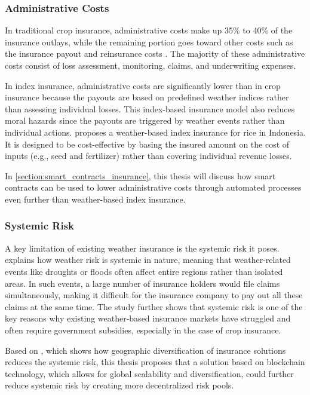 \subsubsection{Administrative Costs}
 
In traditional crop insurance, administrative costs make up 35\% to 40\% of the insurance outlays, while the remaining portion goes toward other costs such as the insurance payout and reinsurance costs \autocite{glauber2004crop}. The majority of these administrative costs consist of loss assessment, monitoring, claims, and underwriting expenses.
 
In index insurance, administrative costs are significantly lower than in crop insurance because the payouts are based on predefined weather indices rather than assessing individual losses. This index-based insurance model also reduces moral hazards since the payouts are triggered by weather events rather than individual actions. \textcite{kusuma2018viable} proposes a weather-based index insurance for rice in Indonesia. It is designed to be cost-effective by basing the insured amount on the cost of inputs (e.g., seed and fertilizer) rather than covering individual revenue losses.
 
In \cref{section:smart_contracts_insurance}, this thesis will discuss how smart contracts can be used to lower administrative costs through automated processes even further than weather-based index insurance.
 
\subsubsection{Systemic Risk}
 
A key limitation of existing weather insurance is the systemic risk it poses. \textcite{xu2010systemic} explains how weather risk is systemic in nature, meaning that weather-related events like droughts or floods often affect entire regions rather than isolated areas. In such events, a large number of insurance holders would file claims simultaneously, making it difficult for the insurance company to pay out all these claims at the same time. The study further shows that systemic risk is one of the key reasons why existing weather-based insurance markets have struggled and often require government subsidies, especially in the case of crop insurance.
 
Based on \textcite{salgueiro2021diversification}, which shows how geographic diversification of insurance solutions reduces the systemic risk, this thesis proposes that a solution based on blockchain technology, which allows for global scalability and diversification, could further reduce systemic risk by creating more decentralized risk pools.
 
